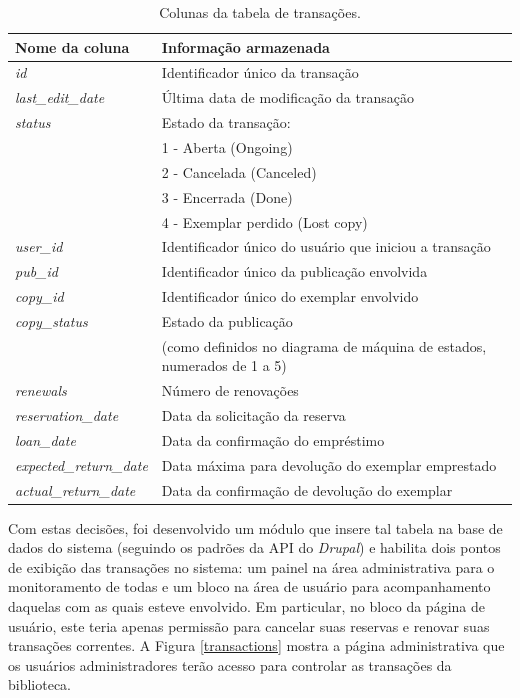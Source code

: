 \documentclass[a4paper]{article}
\begin{document}
\begin{table}[hc]
\centering
\caption{Colunas da tabela de transações.\label{transactions-table}}
\begin{tabular}{ll}
\hline
Nome da coluna & Informação armazenada \\
\hline
\textit{id}                        & {Identificador único da transação} \\
\hline
\textit{last\_edit\_date}        & {Última data de modificação da transação} \\
\hline
\textit{status}                    & Estado da transação:\\
&                                1 - Aberta (Ongoing)\\
&                                2 - Cancelada (Canceled)\\
&                                3 - Encerrada (Done)\\
&                                4 - Exemplar perdido (Lost copy) \\
\hline
\textit{user\_id}                & {Identificador único do usuário que iniciou a transação} \\
\hline
\textit{pub\_id}                & {Identificador único da publicação envolvida} \\
\hline
\textit{copy\_id}                & {Identificador único do exemplar envolvido} \\
\hline
\textit{copy\_status}            & Estado da publicação\\
&                                (como definidos no diagrama de máquina de estados, numerados de 1 a 5) \\
\hline
\textit{renewals}                & {Número de renovações} \\
\hline
\textit{reservation\_date}        & {Data da solicitação da reserva} \\
\hline
\textit{loan\_date}                & {Data da confirmação do empréstimo} \\
\hline
\textit{expected\_return\_date}    & {Data máxima para devolução do exemplar emprestado} \\
\hline
\textit{actual\_return\_date}        & {Data da confirmação de devolução do exemplar} \\
\hline
\end{tabular}
\end{table}

Com estas decisões, foi desenvolvido um módulo que insere tal tabela na base de dados do sistema (seguindo os padrões da API do \textit{Drupal}) e habilita dois pontos de exibição das transações no sistema: um painel na área administrativa para o monitoramento de todas e um bloco na área de usuário para acompanhamento daquelas com as quais esteve envolvido. Em particular, no bloco da página de usuário, este teria apenas permissão para cancelar suas reservas e renovar suas transações correntes. A Figura \ref{transactions} mostra a página administrativa que os usuários administradores terão acesso para controlar as transações da biblioteca.
\end{document}
